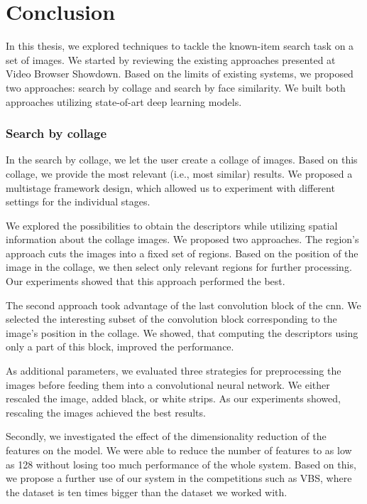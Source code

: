 \chapter*{Conclusion}

In this thesis, we explored techniques to tackle the known-item search task on a set of images. We started by reviewing the existing approaches presented at Video Browser Showdown. Based on the limits of existing systems, we proposed two approaches: search by collage and search by face similarity. We built both approaches utilizing state-of-art deep learning models. 

\subsection*{Search by collage}

In the search by collage, we let the user create a collage of images. Based on this collage, we provide the most relevant (i.e., most similar) results. We proposed a multistage framework design, which allowed us to experiment with different settings for the individual stages.

We explored the possibilities to obtain the descriptors while utilizing spatial information about the collage images. We proposed two approaches. The region's approach cuts the images into a fixed set of regions. Based on the position of the image in the collage, we then select only relevant regions for further processing. Our experiments showed that this approach performed the best. 

The second approach took advantage of the last convolution block of the \acrshort{cnn}. We selected the interesting subset of the convolution block corresponding to the image's position in the collage. We showed, that computing the descriptors using only a part of this block, improved the performance. 

As additional parameters, we evaluated three strategies for preprocessing the images before feeding them into a convolutional neural network. We either rescaled the image, added black, or white strips. As our experiments showed, rescaling the images achieved the best results.

Secondly, we investigated the effect of the dimensionality reduction of the features on the model. We were able to reduce the number of features to as low as 128 without losing too much performance of the whole system. Based on this, we propose a further use of our system in the competitions such as VBS, where the dataset is ten times bigger than the dataset we worked with.


